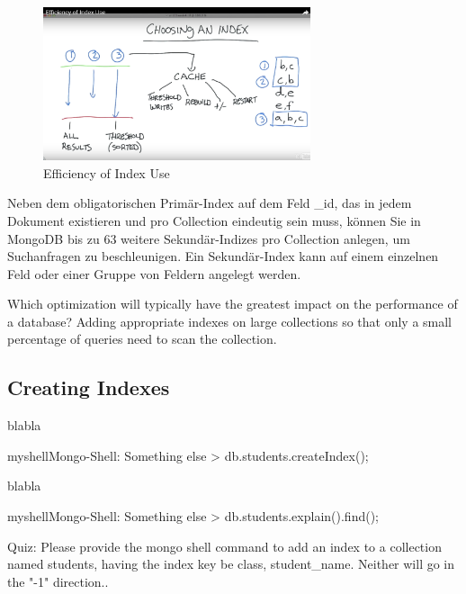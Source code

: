 \begin{figure}
\centering
	\includegraphics[width=0.7\textwidth]{resources/efficiencyOfIndexUse}
\caption[Efficiency of Index Use]{Efficiency of Index Use\protect\footnotemark}
\label{img:EfficiencyofIndexUse}
\end{figure}


Neben dem obligatorischen Primär-Index auf dem Feld \_id, das in jedem Dokument existieren und pro Collection eindeutig sein muss, können Sie in MongoDB bis zu 63 weitere Sekundär-Indizes pro Collection anlegen, um Suchanfragen zu beschleunigen. Ein Sekundär-Index kann auf einem einzelnen Feld oder einer Gruppe von Feldern angelegt werden.%

Which optimization will typically have the greatest impact on the performance of a database?\newline
Adding appropriate indexes on large collections so that only a small percentage of queries need to scan the collection.

\subsection{Creating Indexes}
blabla

\begin{listingsboxShell}[label={lst:X}]{myshell}{Mongo-Shell: Something else}
> db.students.createIndex();
\end{listingsboxShell}

blabla

\begin{listingsboxShell}[label={lst:X}]{myshell}{Mongo-Shell: Something else}
> db.students.explain().find();
\end{listingsboxShell}

Quiz: Please provide the mongo shell command to add an index to a collection named students, having the index key be class, student\_name.
Neither will go in the "-1" direction..

